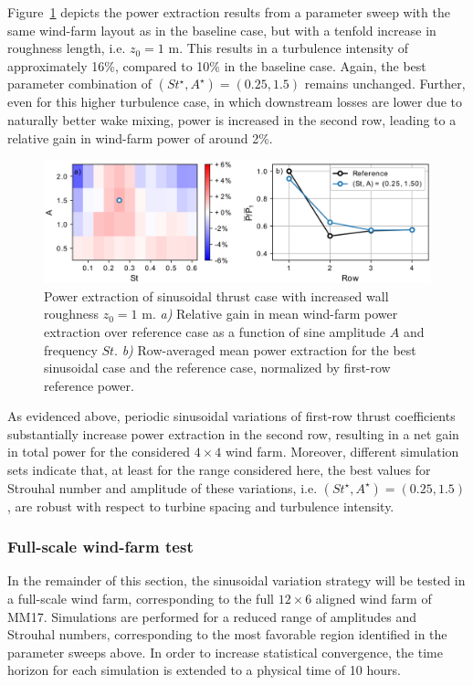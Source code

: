 \documentclass[wes, manuscript]{copernicus}
\begin{document}
Figure~\ref{fig:sinus_roughness} depicts the power extraction results from a parameter sweep with the same wind-farm layout as in the baseline case, but with a tenfold increase in roughness length, i.e. $z_0 = 1$ m. This results in a turbulence intensity of approximately 16\%, compared to 10\% in the baseline case. Again, the best parameter combination of $(St^\star, A^\star) = (0.25, 1.5)$ remains unchanged. Further, even for this higher turbulence case, in which downstream losses are lower due to naturally better wake mixing, power is increased in the second row, leading to a relative gain in wind-farm power of around 2\%. 
\begin{figure}
	\centering
	\includegraphics[width=\textwidth]{figure18}
	\caption{Power extraction of sinusoidal thrust case with increased wall roughness $z_0 = 1$ m. \emph{a) } Relative gain in mean wind-farm power extraction over reference case as a function of sine amplitude $A$ and frequency $St$. \emph{b) } Row-averaged mean power extraction for the best sinusoidal case and the reference case, normalized by first-row reference power.\label{fig:sinus_roughness} }
\end{figure}


As evidenced above, periodic sinusoidal variations of first-row thrust coefficients substantially increase power extraction in the second row, resulting in a net gain in total power for the considered $4\times4$ wind farm. Moreover, different simulation sets indicate that, at least for the range considered here, the best values for Strouhal number and amplitude of these variations, i.e. $(St^\star, A^\star) = (0.25, 1.5)$, are robust with respect to turbine spacing and turbulence intensity. 

\subsubsection{Full-scale wind-farm test}
In the remainder of this section, the sinusoidal variation strategy will be tested in a full-scale wind farm, corresponding to the full $12 \times 6$ aligned wind farm of MM17. Simulations are performed for a reduced range of amplitudes and Strouhal numbers, corresponding to the most favorable region identified in the parameter sweeps above. In order to increase statistical convergence, the time horizon for each simulation is extended to a physical time of 10 hours. 
\end{document}
